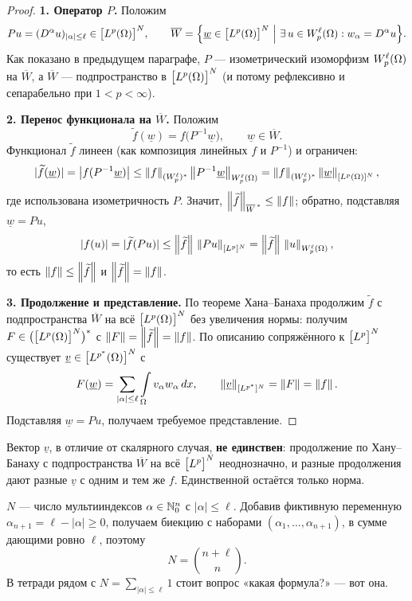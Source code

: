 \begin{proof}
\textbf{1. Оператор $P$.} Положим
\[
  P u = (D^\alpha u)_{|\alpha| \le \ell} \in \big[\Lp{p}(\Om)\big]^N ,
  \qquad
  \overline{W} = \Big\{ \underline w \in \big[\Lp{p}(\Om)\big]^N \ \Big|\
  \exists\, u \in \Wp{p}{\ell}(\Om): w_\alpha = D^\alpha u \Big\} .
\]
Как показано в предыдущем параграфе, $P$ — изометрический изоморфизм
$W_{p}^{\ell}(\Omega)$ на $\overline W$, а $\overline W$ — подпространство
в $\big[L^{p}(\Omega)\big]^N$ (и потому рефлексивно и сепарабельно при $1 < p < \infty$).

\textbf{2. Перенос функционала на $\overline W$.} Положим
\[
  \widetilde f(\underline w) = f\big(P^{-1}\underline w\big), \qquad \underline w \in \overline W .
\]
Функционал $\widetilde f$ линеен (как композиция линейных $f$ и $P^{-1}$) и ограничен:
\[
  |\widetilde f(\underline w)| = \big| f(P^{-1}\underline w) \big|
  \le \left\lVert f \right\rVert_{(W_{p}^{\ell})^*} \left\lVert P^{-1}\underline w \right\rVert_{W_{p}^{\ell}(\Omega)}
  = \left\lVert f \right\rVert_{(W_{p}^{\ell})^*} \left\lVert \underline w \right\rVert_{[L^{p}(\Omega)]^N} ,
\]
где использована изометричность $P$. Значит,
$\left\lVert \widetilde f \right\rVert_{\overline W^{\,*}} \le \left\lVert f \right\rVert$; обратно, подставляя
$\underline w = Pu$,
\[
  |f(u)| = |\widetilde f(Pu)| \le \left\lVert \widetilde f \right\rVert\, \left\lVert Pu \right\rVert_{[L^{p}]^N}
  = \left\lVert \widetilde f \right\rVert\, \left\lVert u \right\rVert_{W_{p}^{\ell}(\Omega)} ,
\]
то есть $\left\lVert f \right\rVert \le \left\lVert \widetilde f \right\rVert$ и $\left\lVert \widetilde f \right\rVert = \left\lVert f \right\rVert$.

\textbf{3. Продолжение и представление.} По теореме Хана--Банаха продолжим $\widetilde f$
с подпространства $\overline W$ на всё $\big[L^{p}(\Omega)\big]^N$ без увеличения нормы:
получим $F \in \big(\big[L^{p}(\Omega)\big]^N\big)^*$ с $\left\lVert F \right\rVert = \left\lVert \widetilde f \right\rVert = \left\lVert f \right\rVert$.
По описанию сопряжённого к $\big[L^{p}\big]^N$ существует
$\underline v \in \big[L^{p^*}(\Omega)\big]^N$ с
\[
  F(\underline w) = \sum_{|\alpha| \le \ell} \int\limits_\Omega v_\alpha w_\alpha\, dx ,
  \qquad \left\lVert \underline v \right\rVert_{[L^{p^*}]^N} = \left\lVert F \right\rVert = \left\lVert f \right\rVert .
\]
Подставляя $\underline w = Pu$, получаем требуемое представление.
\end{proof}

\begin{idea}
Вектор $\underline v$, в отличие от скалярного случая, \textbf{не единствен}: продолжение
по Хану--Банаху с подпространства $\overline W$ на всё $\big[L^{p}\big]^N$ неоднозначно,
и разные продолжения дают разные $\underline v$ с одним и тем же $f$. Единственной
остаётся только норма.
\end{idea}

\begin{idea}[title={Чему равно $N$}]
$N$ — число мультииндексов $\alpha \in \mathbb{N}_0^n$ с $|\alpha| \le \ell$. Добавив фиктивную
переменную $\alpha_{n+1} = \ell - |\alpha| \ge 0$, получаем биекцию с наборами
$(\alpha_1, \dots, \alpha_{n+1})$, в сумме дающими ровно $\ell$, поэтому
\[
  N = \binom{n + \ell}{n} .
\]
В тетради рядом с $N = \sum_{|\alpha|\le\ell} 1$ стоит вопрос «какая формула?» — вот она.
\end{idea}

